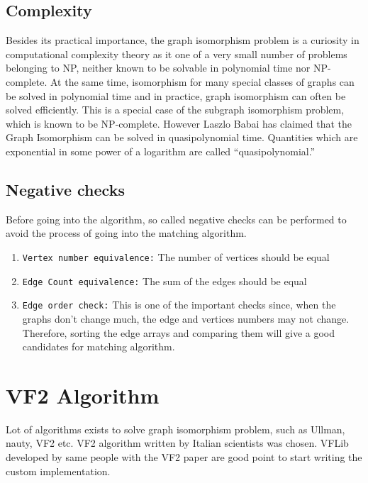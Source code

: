 \subsection{Complexity}
Besides its practical importance, the graph isomorphism problem is a curiosity in computational complexity theory as it one of a
very small number of problems belonging to NP, neither known to be solvable in polynomial time nor NP-complete. At the same time, isomorphism
for many special classes of graphs can be solved in polynomial time and in practice, graph isomorphism can often be solved efficiently.
This is a special case of the subgraph isomorphism problem, which is known to be NP-complete. However Laszlo Babai has claimed that the 
Graph Isomorphism can be solved in quasipolynomial time. Quantities which are exponential in some power of a logarithm are called “quasipolynomial.”

\subsection{Negative checks}
Before going into the algorithm, so called negative checks can be performed to avoid the process of going into the matching algorithm.
\begin{enumerate}
\item \texttt{Vertex number equivalence:} The number of vertices should be equal

\item \texttt{Edge Count equivalence:} The sum of the edges should be equal

\item \texttt{Edge order check:} This is one of the important checks since, when the graphs don't change much, the edge and vertices numbers may not change. Therefore, sorting the edge arrays and 
comparing them will give a good candidates for matching algorithm.
\end{enumerate}

\section{VF2 Algorithm}
Lot of algorithms exists to solve graph isomorphism problem, such as Ullman, nauty, VF2 etc. VF2 algorithm written by Italian scientists was chosen. VFLib developed by same people with the VF2 paper are good point to start writing the custom implementation. 

